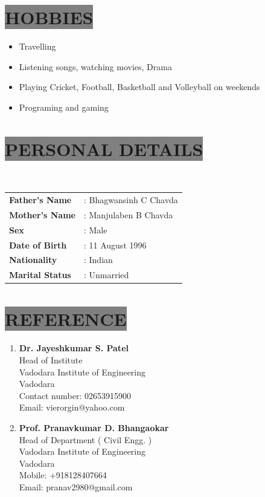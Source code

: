 \documentclass{res}
\begin{document}
\begin{resume}
\section{
\colorbox{grey}{HOBBIES}
}
\begin{itemize}
\item Travelling
\item Listening songs, watching movies, Drama
\item Playing Cricket, Football, Basketball and Volleyball on weekends
\item Programing and gaming
\end{itemize}


\section{
\colorbox{grey}{PERSONAL DETAILS} 
}
\ \\ [0.5ex]
\begin{tabular}{p{4cm}l}
\textbf{Father's Name} &  {:} Bhagwansinh C Chavda\\ [0.5ex]
\textbf{Mother's Name} & {:}  Manjulaben B Chavda \\ [0.5ex]
\textbf{Sex} &  {:} Male\\ [0.5ex]
\textbf{Date of Birth} & {:} 11 August 1996\\ [0.5ex]
\textbf{Nationality} &  {:} Indian\\ [0.5ex]
\textbf{Marital Status} & {:}  Unmarried\\ [0.5ex]
\end{tabular}

\section{
\colorbox{grey}{REFERENCE}
}
\begin{enumerate}

\item \textbf{Dr. Jayeshkumar S. Patel}\\ Head of Institute \\ Vadodara Institute of Engineering \\ Vadodara \\ Contact number: 02653915900 \\ Email: vierorgin@yahoo.com\\ 

\item \textbf{Prof. Pranavkumar D. Bhangaokar} \\ Head of Department ( Civil Engg. ) \\ Vadodara Institute of Engineering \\ Vadodara \\ Mobile: +918128407664 \\Email: pranav2980@gmail.com \\



\end{enumerate}
\end{resume}
\end{document}
